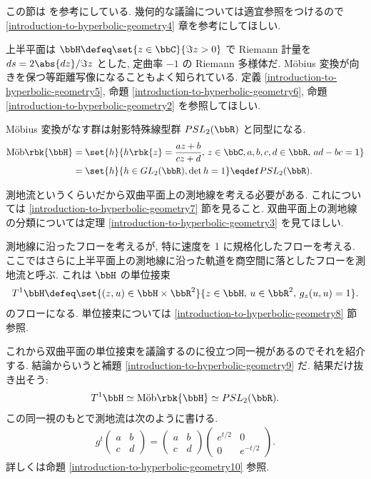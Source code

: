 \documentclass[openany, a4paper, oneside]{jsbook}
\begin{document}
この節は \cite[1.5.5 節, The geodesic flow on hyperbolic surface]{OmriSarig1} を参考にしている.
幾何的な議論については適宜参照をつけるので \ref{introduction-to-hyperbolic-geometry4} 章を参考にしてほしい.

上半平面は $\bbH \defeq \set{z \in \bbC}{\Im z > 0}$ で
Riemann 計量を $ds = 2 \abs{dz} / \Im z$ とした, 定曲率 $-1$ の Riemann 多様体だ.
M\"obius 変換が向きを保つ等距離写像になることもよく知られている.
定義 \ref{introduction-to-hyperbolic-geometry5}, 命題 \ref{introduction-to-hyperbolic-geometry6},
命題 \ref{introduction-to-hyperbolic-geometry2} を参照してほしい.

M\"obius 変換がなす群は射影特殊線型群 $PSL_2(\bbR)$ と同型になる.
\begin{align}
 \text{M\"ob} \rbk{\bbH}
 &=
 \set{h}{h \rbk{z} = \frac{az + b}{cz + d}, \, z \in \bbC, a,b,c,d \in \bbR, \, ad - bc = 1} \\
 &=
 \set{h}{h \in GL_2(\bbR), \det h = 1}
 \eqdef
 PSL_2(\bbR).
\end{align}

測地流というくらいだから双曲平面上の測地線を考える必要がある.
これについては \ref{introduction-to-hyperbolic-geometry7} 節を見ること.
双曲平面上の測地線の分類については定理 \ref{introduction-to-hyperbolic-geometry3} を見てほしい.

測地線に沿ったフローを考えるが, 特に速度を 1 に規格化したフローを考える.
ここではさらに上半平面上の測地線に沿った軌道を商空間に落としたフローを測地流と呼ぶ.
これは $\bbH$ の単位接束
\begin{align}
 T^1 \bbH
 \defeq
 \set{(z, u) \in \bbH \times \bbR^2}{z \in \bbH, \, u \in \bbR^2, \, g_z(u, u) = 1}.
\end{align}
のフローになる.
単位接束については \ref{introduction-to-hyperbolic-geometry8} 節参照.

これから双曲平面の単位接束を議論するのに役立つ同一視があるのでそれを紹介する.
結論からいうと補題 \ref{introduction-to-hyperbolic-geometry9} だ.
結果だけ抜き出そう:
\begin{align}
 T^1 \bbH
 \simeq
 \text{M\"ob} \rbk{\bbH}
 \simeq
 PSL_2(\bbR).
\end{align}
この同一視のもとで測地流は次のように書ける.
\begin{align}
 g^t
 \begin{pmatrix}
  a & b \\
  c & d
 \end{pmatrix}
 =
 \begin{pmatrix}
  a & b \\
  c & d
 \end{pmatrix}
 \begin{pmatrix}
  e^{t/2} & 0 \\
  0       & e^{-t / 2}
 \end{pmatrix}.
\end{align}
詳しくは命題 \ref{introduction-to-hyperbolic-geometry10} 参照.
\end{document}
